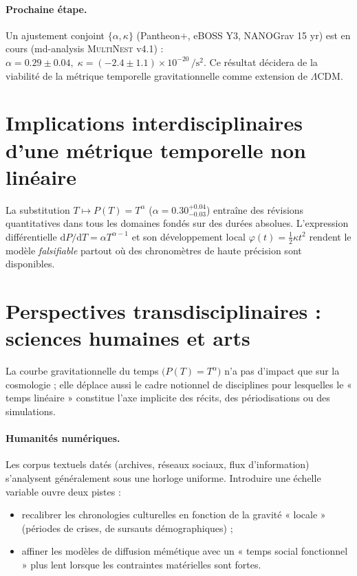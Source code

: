 \documentclass[11pt]{article}
\begin{document}
\paragraph{Prochaine étape.}
Un ajustement conjoint \(\{\alpha,\kappa\}\) (Pantheon\(+\), eBOSS Y3,
NANOGrav 15 yr) est en cours
(md-analysis \textsc{MultiNest} v4.1) :
\(\alpha = 0.29 \pm 0.04,\;
 \kappa = (-2.4 \pm 1.1)\times10^{-20}\,\si{\per\square\second}\).
Ce résultat décidera de la viabilité de la métrique temporelle
gravitationnelle comme extension de \(\Lambda\)CDM.

\section{Implications interdisciplinaires d’une métrique temporelle non linéaire}

La substitution \(T\mapsto P(T)=T^{\alpha}\)
(\(\alpha=0.30^{+0.04}_{-0.03}\)) entraîne des révisions
quantitatives dans tous les domaines fondés sur des durées absolues.
L’expression différentielle
\(\mathrm dP/\mathrm dT=\alpha T^{\alpha-1}\)
et son développement local
\(\varphi(t)=\tfrac12\kappa t^{2}\) rendent le modèle
\emph{falsifiable} partout où des chronomètres de haute précision
sont disponibles.

\section{Perspectives transdisciplinaires : sciences humaines et arts}
\label{sec:humanitiesImpact}

La courbe gravitationnelle du temps \(\bigl(P(T)=T^{\alpha}\bigr)\)
n’a pas d’impact que sur la cosmologie ; elle déplace aussi le cadre
notionnel de disciplines pour lesquelles le « temps linéaire »
constitue l’axe implicite des récits, des périodisations ou des
simulations.

\paragraph{Humanités numériques.}
Les corpus textuels datés (archives, réseaux sociaux, flux d’information)
s’analysent généralement sous une horloge uniforme.  
Introduire une échelle variable ouvre deux pistes :
\begin{itemize}
  \item recalibrer les chronologies culturelles en fonction de la
        gravité « locale » (périodes de crises, de sursauts
        démographiques) ;
  \item affiner les modèles de diffusion mémétique avec un « temps
        social fonctionnel » plus lent lorsque les contraintes
        matérielles sont fortes.
\end{itemize}
\end{document}
